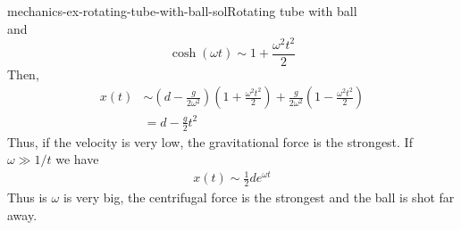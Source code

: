 \documentclass[preview]{standalone}
\begin{document}
\begin{snippetsolution}{mechanics-ex-rotating-tube-with-ball-sol}{Rotating tube with ball}
\[    \] and 
    \[
        \cosh(\omega t) \sim 1 + \frac{\omega^2 t^2}{2}
    \]
    Then,
    \begin{align*}
        x(t) &\sim \left(d - \frac{g}{2\omega^2}\right)
        \left(1 + \frac{\omega^2t^2}{2}\right)
        + \frac{g}{2\omega^2}\left(1 - \frac{\omega^2t^2}{2}\right) \\
        &= d - \frac{g}{2}t^2
    \end{align*}
    Thus, if the velocity is very low, the gravitational force is the strongest.
    If \(\omega \gg 1/t\) we have
    \begin{align*}
        x(t) \sim \frac{1}{2}de^{\omega t}
    \end{align*}
    Thus is \(\omega\) is very big, the centrifugal force is the strongest and the ball is shot far away.
\end{snippetsolution}
\end{document}
